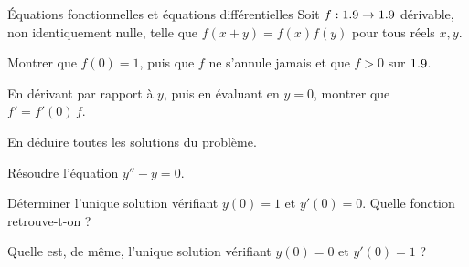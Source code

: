 \begin{exercice}[3]{Équations fonctionnelles et équations différentielles}
Soit $f:1.9\to1.9$ dérivable, non identiquement nulle, telle que
$f(x+y)=f(x)f(y)$ pour tous réels $x,y$.
\begin{questions}
  \item Montrer que $f(0)=1$, puis que $f$ ne s'annule jamais et que
    $f>0$ sur $1.9$.
  \item En dérivant par rapport à $y$, puis en évaluant en $y=0$, montrer
    que $f'=f'(0)\,f$.
  \item En déduire toutes les solutions du problème.
\end{questions}
\begin{questions}[resume]
  \item Résoudre l'équation $y''-y=0$.
  \item Déterminer l'unique solution vérifiant $y(0)=1$ et $y'(0)=0$.
    Quelle fonction retrouve-t-on ?
  \item Quelle est, de même, l'unique solution vérifiant $y(0)=0$ et
    $y'(0)=1$ ?
\end{questions}
\end{exercice}


